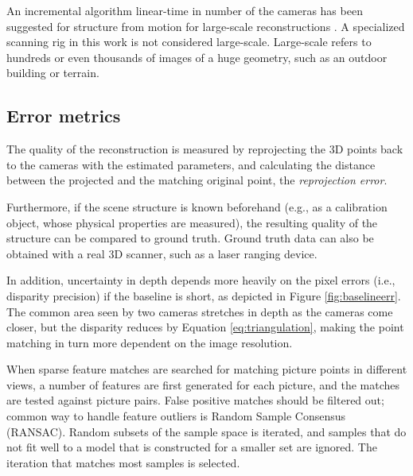 An incremental algorithm linear-time in number of the cameras has been suggested for structure from motion for large-scale reconstructions \cite{wu2013towards}.
A specialized scanning rig in this work is not considered large-scale.
Large-scale refers to hundreds or even thousands of images of a huge geometry, such as an outdoor building or terrain.


\subsection{Error metrics} %

The quality of the reconstruction is measured by reprojecting the 3D points back to the cameras with the estimated parameters, and calculating the distance between the projected and the matching original point, the \emph{reprojection error}. \cite{hartley03multiview}

Furthermore, if the scene structure is known beforehand (e.g., as a calibration object, whose physical properties are measured), the resulting quality of the structure can be compared to ground truth.
Ground truth data can also be obtained with a real 3D scanner, such as a laser ranging device. %

In addition, uncertainty in depth depends more heavily on the pixel errors (i.e., disparity precision) if the baseline is short, as depicted in Figure \ref{fig:baselineerr}.
The common area seen by two cameras stretches in depth as the cameras come closer, but the disparity reduces by Equation \ref{eq:triangulation}, making the point matching in turn more dependent on the image resolution.


When sparse feature matches are searched for matching picture points in different views, a number of features are first generated for each picture, and the matches are tested against picture pairs.
False positive matches should be filtered out; common way to handle feature outliers is Random Sample Consensus (RANSAC).
Random subsets of the sample space is iterated, and samples that do not fit well to a model that is constructed for a smaller set are ignored.
The iteration that matches most samples is selected. \cite{hartley03multiview}

